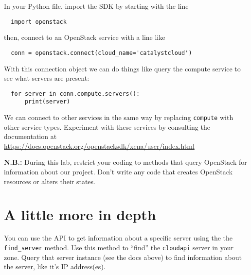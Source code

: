 \documentclass{article}
\begin{document}
In your Python file, import the SDK by starting with the line

\begin{verbatim}
  import openstack
\end{verbatim}

then, connect to an OpenStack service with a line like

\begin{verbatim}
  conn = openstack.connect(cloud_name='catalystcloud')
\end{verbatim}

With this connection object we can do things like query the compute service to see what servers are present:

\begin{verbatim}
  for server in conn.compute.servers():
      print(server)
\end{verbatim}

We can connect to other services in the same way by replacing \texttt{compute} with other service types. Experiment with these services by consulting the documentation at \url{https://docs.openstack.org/openstacksdk/xena/user/index.html}

\textbf{N.B.:} During this lab, restrict your coding to methods that query OpenStack for information about our project. Don't write any code that creates OpenStack resources or alters their states.

\section{A little more in depth}
You can use the API to get information about a specific server using the the \texttt{find\_server} method. Use this method to ``find'' the \texttt{cloudapi} server in your zone. Query that server instance (see the docs above) to find information about the server, like it's IP address(es).
\end{document}
